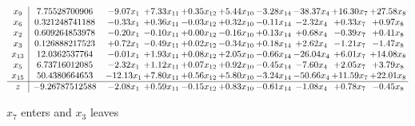 \documentclass[9pt]{article}
\begin{document}
 \[\begin{array}{c| c c@{\hskip 2pt} c@{\hskip 2pt} c@{\hskip 2pt} c@{\hskip 2pt} c@{\hskip 2pt} c@{\hskip 2pt} c@{\hskip 2pt} c@{\hskip 2pt} }
 x_{9}   &  7.75528700906 & -9.07 x_{1} & +  7.33 x_{11} & +  0.35 x_{12} & +  5.44 x_{10} & -3.28 x_{14} & -38.37 x_{4} & + 16.30 x_{7} & + 27.58 x_{8}\\
 x_{6}   &  0.321248741188 & -0.33 x_{1} & +  0.36 x_{11} & -0.03 x_{12} & +  0.32 x_{10} & -0.11 x_{14} & -2.32 x_{4} & +  0.33 x_{7} & +  0.97 x_{8}\\
 x_{2}   &  0.609264853978 & -0.20 x_{1} & -0.10 x_{11} & +  0.00 x_{12} & -0.16 x_{10} & +  0.13 x_{14} & +  0.68 x_{4} & -0.39 x_{7} & +  0.41 x_{8}\\
 x_{3}   &  0.126888217523 & +  0.72 x_{1} & -0.49 x_{11} & +  0.02 x_{12} & -0.34 x_{10} & +  0.18 x_{14} & +  2.62 x_{4} & -1.21 x_{7} & -1.47 x_{8}\\
 x_{13}   &  12.0362537764 & -0.01 x_{1} & +  1.93 x_{11} & +  0.08 x_{12} & +  2.05 x_{10} & -0.66 x_{14} & -26.04 x_{4} & +  6.01 x_{7} & + 14.08 x_{8}\\
 x_{5}   &  6.73716012085 & -2.32 x_{1} & +  1.12 x_{11} & +  0.07 x_{12} & +  0.92 x_{10} & -0.45 x_{14} & -7.60 x_{4} & +  2.05 x_{7} & +  3.79 x_{8}\\
 x_{15}   &  50.4380664653 & -12.13 x_{1} & +  7.80 x_{11} & +  0.56 x_{12} & +  5.80 x_{10} & -3.24 x_{14} & -50.66 x_{4} & + 11.59 x_{7} & + 22.01 x_{8}\\
\hline
z    &  -9.26787512588 & -2.08 x_{1} & +  0.59 x_{11} & -0.15 x_{12} & +  0.83 x_{10} & -0.61 x_{14} & -1.08 x_{4} & +  0.78 x_{7} & -0.45 x_{8}\\
\end{array}\]


 $ x_{7} $ enters and $ x_{3} $ leaves 
\end{document}

